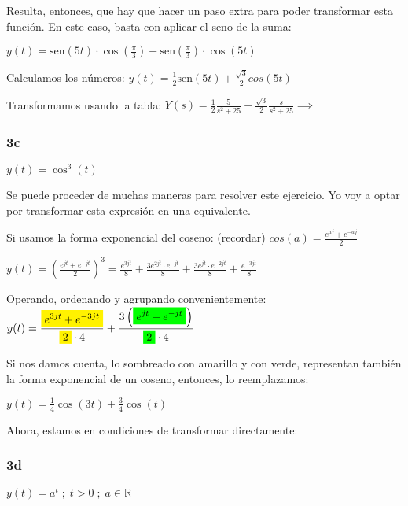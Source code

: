 \documentclass[11pt]{article}
\def\sen{\mathrm{sen}}
\newcommand{\highlight}[2]{\colorbox{#1}{$\displaystyle #2$}}
\begin{document}
    Resulta, entonces, que hay que hacer un paso extra para poder transformar esta función. En este caso, basta con aplicar el seno de la suma:
    
    $\displaystyle y(t)=\sen \left(5t\right)\cdot \cos\left(\frac{\pi}{3}\right)+ \sen\left(\frac{\pi}{3}\right)\cdot\cos\left(5t\right)$
    
    Calculamos los números: $\displaystyle y(t)=\frac{1}{2}\sen(5t)+\frac{\sqrt{3}}{2}cos(5t)$
    
    Transformamos usando la tabla: $\displaystyle Y(s)=\frac{1}{2}\frac{5}{s^{2}+25}+\frac{\sqrt{3}}{2}\frac{s}{s^{2}+25}\implies$ 
    
    \subsubsection{3c}
    $y(t)=\cos^{3}(t)$
    
    Se puede proceder de muchas maneras para resolver este ejercicio. Yo voy a optar por transformar esta expresión en una equivalente.
    
    Si usamos la forma exponencial del coseno: (recordar) $\displaystyle cos(a)=\frac{e^{aj}+e^{-aj}}{2}$
    
    $\displaystyle y(t)=\left(\frac{e^{jt}+e^{-jt}}{2}\right)^{3}
    =\frac{e^{3jt}}{8}+\frac{3e^{2jt}\cdot e^{-jt}}{8}+\frac{3e^{jt}\cdot e^{-2jt}}{8}+\frac{e^{-3jt}}{8}$
    
    Operando, ordenando y agrupando convenientemente: $\displaystyle y(t)=
    \frac{\highlight{yellow}{ e^{3jt}+e^{-3jt}}}{\highlight{yellow}{2}\cdot4}+\frac{3\left( \highlight{green}{e^{jt}+e^{-jt}} \right)} {\highlight{green}{2}\cdot4}$
    
    Si nos damos cuenta, lo sombreado con amarillo y con verde, representan también la forma exponencial de un coseno, entonces, lo reemplazamos:
    
    $\displaystyle y(t)=\frac{1}{4}\cos(3t)+\frac{3}{4}\cos(t)$
    
    Ahora, estamos en condiciones de transformar directamente: 
    
    \subsubsection{3d}
    $y(t)=a^{t} \; ; \; t>0 \; ; \; a \in \mathbb{R}^{+}$
    
\end{document}
